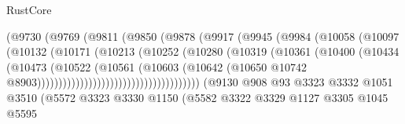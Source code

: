 \begin{lexlean}{RustCore}
\begin{coremodule}
                                            (@9730
                                              (@9769
                                                (@9811
                                                  (@9850
                                                    (@9878
                                                      (@9917
                                                        (@9945
                                                          (@9984
                                                            (@10058
                                                              (@10097
                                                                (@10132
                                                                  (@10171
                                                                    (@10213
                                                                      (@10252
                                                                        (@10280
                                                                          (@10319
                                                                            (@10361
                                                                              (@10400
                                                                                (@10434
                                                                                  (@10473
                                                                                    (@10522
                                                                                      (@10561
                                                                                        (@10603
                                                                                          (@10642
                                                                                            (@10650
                                                                                              @10742
                                                                                              @8903))))))))))))))))))))))))))))))))))))))
                  (@9130
                    @908
                    @93
                    @3323
                    @3332
                    @1051
                    @3510
                    (@5572
                      @3323
                      @3330
                      @1150
                      (@5582
                        @3322
                        @3329
                        @1127
                        @3305
                        @1045
                        @5595

\end{coremodule}
\end{lexlean}
